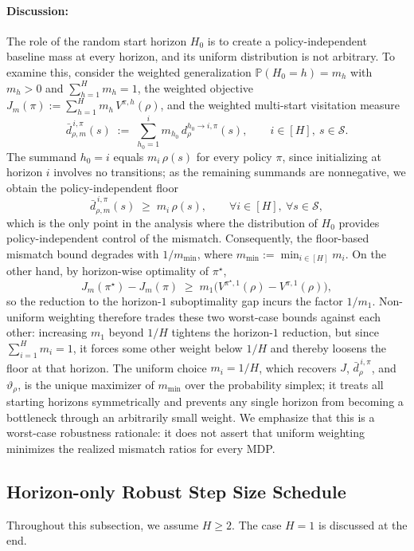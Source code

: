 \documentclass[11pt]{article}
\begin{document}
\paragraph{Discussion:}
The role of the random start horizon $H_0$ is to create a policy-independent
baseline mass at every horizon, and its uniform distribution is not arbitrary.
To examine this, consider the weighted generalization $\mathbb P(H_0=h)=m_h$ with
$m_h>0$ and $\sum_{h=1}^H m_h=1$, the weighted objective
$J_m(\pi):=\sum_{h=1}^H m_h\,V^{\pi,h}(\rho)$, and the weighted multi-start
visitation measure
\[
\bar d^{\,i,\pi}_{\rho,m}(s)\;:=\;\sum_{h_0=1}^{i} m_{h_0}\,
d^{h_0\to i,\pi}_\rho(s),
\qquad i\in[H],\ s\in\mathcal S.
\]
The summand $h_0=i$ equals $m_i\,\rho(s)$ for every policy $\pi$, since
initializing at horizon $i$ involves no transitions; as the remaining
summands are nonnegative, we obtain the policy-independent floor
\[
\bar d^{\,i,\pi}_{\rho,m}(s)\;\ge\; m_i\,\rho(s),
\qquad \forall i\in[H],\ \forall s\in\mathcal S,
\]
which is the only point in the analysis where the distribution of $H_0$
provides policy-independent control of the mismatch. Consequently, the
floor-based mismatch bound degrades with $1/m_{\min}$, where
$m_{\min}:=\min_{i\in[H]}m_i$. On the other hand, by horizon-wise optimality
of $\pi^\star$,
\[
J_m(\pi^\star)-J_m(\pi)
\;\ge\;
m_1\big(V^{\pi^\star,1}(\rho)-V^{\pi,1}(\rho)\big),
\]
so the reduction to the horizon-$1$ suboptimality gap incurs the factor
$1/m_1$. Non-uniform weighting therefore trades these two worst-case bounds against
each other: increasing $m_1$ beyond $1/H$ tightens the horizon-$1$ reduction,
but since $\sum_{i=1}^H m_i=1$, it forces some other weight below $1/H$ and
thereby loosens the floor at that horizon. The uniform choice $m_i=1/H$,
which recovers $J$, $\bar d^{\,i,\pi}_\rho$, and $\vartheta_\rho$, is the
unique maximizer of $m_{\min}$ over the probability simplex; it treats all
starting horizons symmetrically and prevents any single horizon from becoming
a bottleneck through an arbitrarily small weight. We emphasize that this is a
worst-case robustness rationale: it does not assert that uniform weighting
minimizes the realized mismatch ratios for every MDP.

\subsection{Horizon-only Robust Step Size Schedule} \label{subsec:robust_increasing}

Throughout this subsection, we assume $H\ge2$. The case $H=1$ is discussed at the end.
\end{document}
